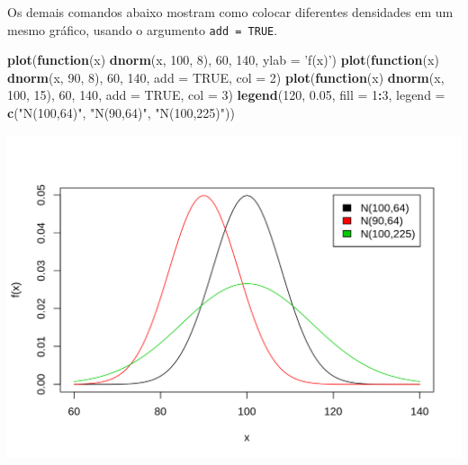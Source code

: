\documentclass[10pt,a4paper]{book}
\newenvironment{Shaded}{\begin{snugshade}}{\end{snugshade}}
\newcommand{\KeywordTok}[1]{\textcolor[rgb]{0.13,0.29,0.53}{\textbf{#1}}}
\newcommand{\DataTypeTok}[1]{\textcolor[rgb]{0.13,0.29,0.53}{#1}}
\newcommand{\DecValTok}[1]{\textcolor[rgb]{0.00,0.00,0.81}{#1}}
\newcommand{\FloatTok}[1]{\textcolor[rgb]{0.00,0.00,0.81}{#1}}
\newcommand{\StringTok}[1]{\textcolor[rgb]{0.31,0.60,0.02}{#1}}
\newcommand{\OtherTok}[1]{\textcolor[rgb]{0.56,0.35,0.01}{#1}}
\newcommand{\ControlFlowTok}[1]{\textcolor[rgb]{0.13,0.29,0.53}{\textbf{#1}}}
\newcommand{\OperatorTok}[1]{\textcolor[rgb]{0.81,0.36,0.00}{\textbf{#1}}}
\newcommand{\NormalTok}[1]{#1}
\begin{document}
Os demais comandos abaixo mostram como colocar diferentes densidades em
um mesmo gráfico, usando o argumento \texttt{add\ =\ TRUE}.

\begin{Shaded}
\begin{Highlighting}[]
\KeywordTok{plot}\NormalTok{(}\ControlFlowTok{function}\NormalTok{(x) }\KeywordTok{dnorm}\NormalTok{(x, }\DecValTok{100}\NormalTok{, }\DecValTok{8}\NormalTok{), }\DecValTok{60}\NormalTok{, }\DecValTok{140}\NormalTok{, }\DataTypeTok{ylab =} \StringTok{'f(x)'}\NormalTok{)}
\KeywordTok{plot}\NormalTok{(}\ControlFlowTok{function}\NormalTok{(x) }\KeywordTok{dnorm}\NormalTok{(x, }\DecValTok{90}\NormalTok{, }\DecValTok{8}\NormalTok{), }\DecValTok{60}\NormalTok{, }\DecValTok{140}\NormalTok{, }\DataTypeTok{add =} \OtherTok{TRUE}\NormalTok{, }\DataTypeTok{col =} \DecValTok{2}\NormalTok{)}
\KeywordTok{plot}\NormalTok{(}\ControlFlowTok{function}\NormalTok{(x) }\KeywordTok{dnorm}\NormalTok{(x, }\DecValTok{100}\NormalTok{, }\DecValTok{15}\NormalTok{), }\DecValTok{60}\NormalTok{, }\DecValTok{140}\NormalTok{, }\DataTypeTok{add =} \OtherTok{TRUE}\NormalTok{, }\DataTypeTok{col =} \DecValTok{3}\NormalTok{)}
\KeywordTok{legend}\NormalTok{(}\DecValTok{120}\NormalTok{, }\FloatTok{0.05}\NormalTok{, }\DataTypeTok{fill =} \DecValTok{1}\OperatorTok{:}\DecValTok{3}\NormalTok{,}
       \DataTypeTok{legend =} \KeywordTok{c}\NormalTok{(}\StringTok{"N(100,64)"}\NormalTok{, }\StringTok{"N(90,64)"}\NormalTok{, }\StringTok{"N(100,225)"}\NormalTok{))}
\end{Highlighting}
\end{Shaded}

\begin{center}\includegraphics{figures/unnamed-chunk-346-1} \end{center}
\end{document}
